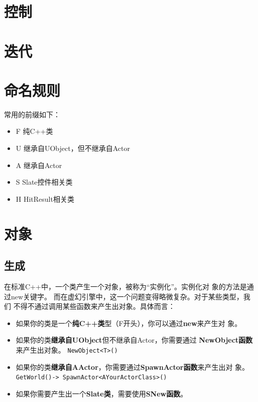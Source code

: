 \documentclass[UTF8,a4paper,12pt]{ctexbook}
\begin{document}
	\section{控制}
		
	
	
	\section{迭代}
		
	
	
	
	\section{命名规则}
		常用的前缀如下：
		\begin{itemize}
			\item F 纯C++类
			\item U 继承自UObject，但不继承自Actor
			\item A 继承自Actor
			\item S Slate控件相关类
			\item H HitResult相关类
		\end{itemize}
		
		
	\section{对象}
		
		\subsection{生成}
			在标准C++中，一个类产生一个对象，被称为“实例化”。实例化对 象的方法是通过new关键字。 而在虚幻引擎中，这一个问题变得略微复杂。对于某些类型，我们 不得不通过调用某些函数来产生出对象。具体而言：
			
			\begin{itemize}
				\item 如果你的类是一个\textbf{纯C++类}型（F开头），你可以通过\textbf{new}来产生对 象。
				\item 如果你的类\textbf{继承自UObject}但不继承自Actor，你需要通过 \textbf{NewObject函数}来产生出对象。 \verb|NewObject<T>()|
				\item 如果你的类\textbf{继承自AActor}，你需要通过\textbf{SpawnActor函数}来产生出对 象。\verb|GetWorld()-> SpawnActor<AYourActorClass>()|
				\item 如果你需要产生出一个\textbf{Slate类}，需要使用\textbf{SNew函数}。
			\end{itemize}
		
\end{document}
